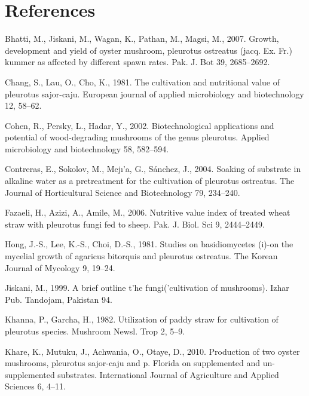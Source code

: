\documentclass[]{elsarticle} %
\begin{document}
\hypertarget{references}{%
\section*{References}\label{references}}

\hypertarget{refs}{}
\leavevmode\hypertarget{ref-bhatti2007growth}{}%
Bhatti, M., Jiskani, M., Wagan, K., Pathan, M., Magsi, M., 2007. Growth,
development and yield of oyster mushroom, pleurotus ostreatus (jacq. Ex.
Fr.) kummer as affected by different spawn rates. Pak. J. Bot 39,
2685--2692.

\leavevmode\hypertarget{ref-chang1981cultivation}{}%
Chang, S., Lau, O., Cho, K., 1981. The cultivation and nutritional value
of pleurotus sajor-caju. European journal of applied microbiology and
biotechnology 12, 58--62.

\leavevmode\hypertarget{ref-cohen2002}{}%
Cohen, R., Persky, L., Hadar, Y., 2002. Biotechnological applications
and potential of wood-degrading mushrooms of the genus pleurotus.
Applied microbiology and biotechnology 58, 582--594.

\leavevmode\hypertarget{ref-contreras2004soaking}{}%
Contreras, E., Sokolov, M., Mejı'a, G., Sánchez, J., 2004. Soaking of
substrate in alkaline water as a pretreatment for the cultivation of
pleurotus ostreatus. The Journal of Horticultural Science and
Biotechnology 79, 234--240.

\leavevmode\hypertarget{ref-fazaeli2006nutritive}{}%
Fazaeli, H., Azizi, A., Amile, M., 2006. Nutritive value index of
treated wheat straw with pleurotus fungi fed to sheep. Pak. J. Biol. Sci
9, 2444--2449.

\leavevmode\hypertarget{ref-hong1981}{}%
Hong, J.-S., Lee, K.-S., Choi, D.-S., 1981. Studies on basidiomycetes
(i)-on the mycelial growth of agaricus bitorquis and pleurotus
ostreatus. The Korean Journal of Mycology 9, 19--24.

\leavevmode\hypertarget{ref-jiskani1999brief}{}%
Jiskani, M., 1999. A brief outline t'he fungi('cultivation of
mushrooms). Izhar Pub. Tandojam, Pakistan 94.

\leavevmode\hypertarget{ref-khanna1982utilization}{}%
Khanna, P., Garcha, H., 1982. Utilization of paddy straw for cultivation
of pleurotus species. Mushroom Newsl. Trop 2, 5--9.

\leavevmode\hypertarget{ref-khare2010}{}%
Khare, K., Mutuku, J., Achwania, O., Otaye, D., 2010. Production of two
oyster mushrooms, pleurotus sajor-caju and p. Florida on supplemented
and un-supplemented substrates. International Journal of Agriculture and
Applied Sciences 6, 4--11.
\end{document}
